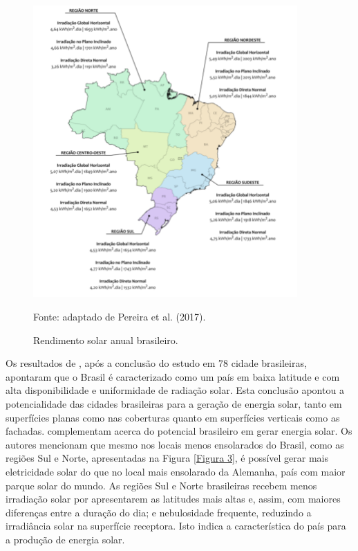 \begin{onehalfspace}
        \begin{figure}[ht]
            \centering
            \caption{\small Rendimento solar anual brasileiro.}
            \includegraphics[width=0.9\textwidth]{figures/fig3-niveis_de_irradiacao_por_regiao_brasileira_pereira_et_al_2017.png}
                \begin{flushleft}
                    \par \small Fonte: adaptado de Pereira et al. (2017).
                \end{flushleft}
            \label{Figura 2}
        \end{figure}\vspace*{-0.4cm}
\noindent Os resultados de \textcite{Cronemberger2012}, após a conclusão do estudo em 78 cidade brasileiras, apontaram que o Brasil é caracterizado como um país em baixa latitude e com alta disponibilidade e uniformidade de radiação solar. Esta conclusão apontou a potencialidade das cidades brasileiras para a geração de energia solar, tanto em superfícies planas como nas coberturas quanto em superfícies verticais como as fachadas.\vspace{0.3cm} \newline
\textcite{Pereira2017} complementam acerca do potencial brasileiro em gerar energia solar. Os autores mencionam que mesmo nos locais menos ensolarados do Brasil, como as regiões Sul e Norte, apresentadas na Figura \ref{Figura 3}, é possível gerar mais eletricidade solar do que no local mais ensolarado da Alemanha, país com maior parque solar do mundo. As regiões Sul e Norte brasileiras recebem menos irradiação solar por apresentarem as latitudes mais altas e, assim, com maiores diferenças entre a duração do dia; e nebulosidade frequente, reduzindo a irradiância solar na superfície receptora. Isto indica a característica do país para a produção de energia solar.%

\end{onehalfspace}
